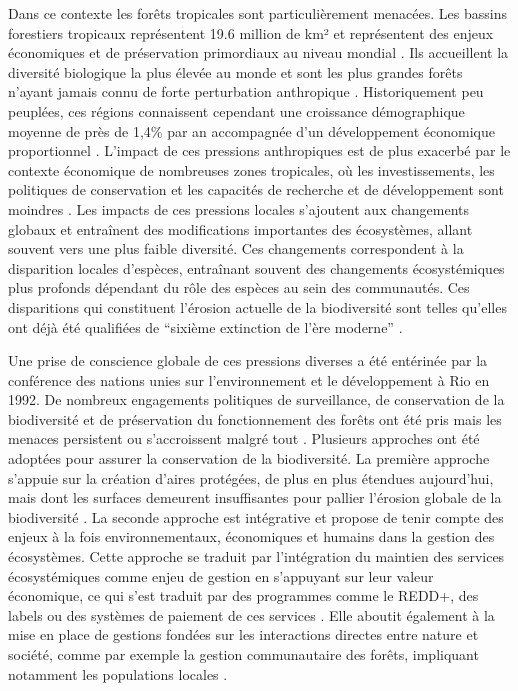 \documentclass[
  11pt,
  french,
  A4paper,
  extrafontsizes,onecolumn,openright
  ]{memoir}
\begin{document}
Dans ce contexte les forêts tropicales sont particulièrement menacées.
Les bassins forestiers tropicaux représentent 19.6 million de km² et
représentent des enjeux économiques et de préservation primordiaux au
niveau mondial \autocites{Dirzo2003a}{Hansen2013}. Ils accueillent la
diversité biologique la plus élevée au monde et sont les plus grandes
forêts n'ayant jamais connu de forte perturbation anthropique
\autocites{Gentry1988}{FAO2011}. Historiquement peu peuplées, ces
régions connaissent cependant une croissance démographique moyenne de
près de 1,4\% par an accompagnée d'un développement économique
proportionnel \autocites{Asner2009}{Barlow2018}. L'impact de ces
pressions anthropiques est de plus exacerbé par le contexte économique
de nombreuses zones tropicales, où les investissements, les politiques
de conservation et les capacités de recherche et de développement sont
moindres \autocite{seeBarlow2018}. Les impacts de ces pressions locales
s'ajoutent aux changements globaux et entraînent des modifications
importantes des écosystèmes, allant souvent vers une plus faible
diversité. Ces changements correspondent à la disparition locales
d'espèces, entraînant souvent des changements écosystémiques plus
profonds dépendant du rôle des espèces au sein des communautés. Ces
disparitions qui constituent l'érosion actuelle de la biodiversité sont
telles qu'elles ont déjà été qualifiées de ``sixième extinction de l'ère
moderne'' \autocites{Vitousek1997}{Cardinale2012}.

Une prise de conscience globale de ces pressions diverses a été
entérinée par la conférence des nations unies sur l'environnement et le
développement à Rio en 1992. De nombreux engagements politiques de
surveillance, de conservation de la biodiversité et de préservation du
fonctionnement des forêts ont été pris mais les menaces persistent ou
s'accroissent malgré tout
\autocites{Summit1992}{Schlaepfer2000}{Dirzo2003a}{Morales-Hidalgo2015}.
Plusieurs approches ont été adoptées pour assurer la conservation de la
biodiversité. La première approche s'appuie sur la création d'aires
protégées, de plus en plus étendues aujourd'hui, mais dont les surfaces
demeurent insuffisantes pour pallier l'érosion globale de la
biodiversité \autocite{Sist2015}. La seconde approche est intégrative et
propose de tenir compte des enjeux à la fois environnementaux,
économiques et humains dans la gestion des écosystèmes. Cette approche
se traduit par l'intégration du maintien des services écosystémiques
comme enjeu de gestion en s'appuyant sur leur valeur économique, ce qui
s'est traduit par des programmes comme le REDD+, des labels ou des
systèmes de paiement de ces services
\autocites{Agrawal2011}{Barlow2018}. Elle aboutit également à la mise en
place de gestions fondées sur les interactions directes entre nature et
société, comme par exemple la gestion communautaire des forêts,
impliquant notamment les populations locales \autocite{Liu2015}.
\end{document}
